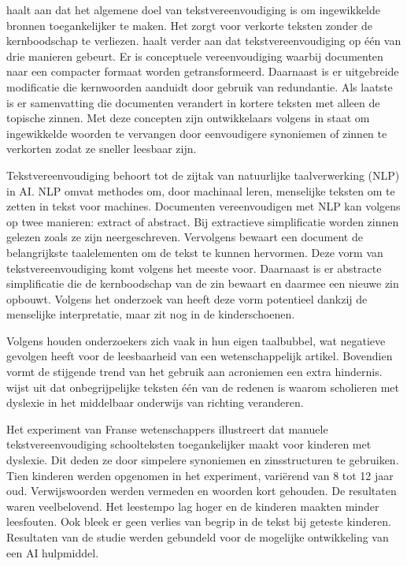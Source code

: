 \textcite{Shardlow2014} haalt aan dat het algemene doel van tekstvereenvoudiging is om ingewikkelde bronnen toegankelijker te maken. Het zorgt voor verkorte teksten zonder de kernboodschap te verliezen. \textcite{Siddharthan2014} haalt verder aan dat tekstvereenvoudiging op één van drie manieren gebeurt. Er is conceptuele vereenvoudiging waarbij documenten naar een compacter formaat worden getransformeerd. Daarnaast is er uitgebreide modificatie die kernwoorden aanduidt door gebruik van redundantie. Als laatste is er samenvatting die documenten verandert in kortere teksten met alleen de topische zinnen. Met deze concepten zijn ontwikkelaars volgens \textcite{Siddharthan2014} in staat om ingewikkelde woorden te vervangen door eenvoudigere synoniemen of zinnen te verkorten zodat ze sneller leesbaar zijn.

Tekstvereenvoudiging behoort tot de zijtak van natuurlijke taalverwerking (NLP) in AI. NLP omvat methodes om, door machinaal leren, menselijke teksten om te zetten in tekst voor machines. Documenten vereenvoudigen met NLP kan volgens \textcite{Chowdhary2020} op twee manieren: extract of abstract. Bij extractieve simplificatie worden zinnen gelezen zoals ze zijn neergeschreven. Vervolgens bewaart een document de belangrijkste taalelementen om de tekst te kunnen hervormen. Deze vorm van tekstvereenvoudiging komt volgens \autocite{Sciforce2020} het meeste voor. Daarnaast is er abstracte simplificatie die de kernboodschap van de zin bewaart en daarmee een nieuwe zin opbouwt. Volgens het onderzoek van \textcite{Chowdhary2020} heeft deze vorm potentieel dankzij de menselijke interpretatie, maar zit nog in de kinderschoenen.

Volgens \textcite{PlavenSigray2017} houden onderzoekers zich vaak in hun eigen taalbubbel, wat negatieve gevolgen heeft voor de leesbaarheid van een wetenschappelijk artikel. Bovendien vormt de stijgende trend van het gebruik aan acroniemen \textcite{Barnett2020} een extra hindernis. \textcite{Donato2022} wijst uit dat onbegrijpelijke teksten één van de redenen is waarom scholieren met dyslexie in het middelbaar onderwijs van richting veranderen.

Het experiment van Franse wetenschappers \newline \textcite{Gala2016} illustreert dat manuele tekstvereenvoudiging schoolteksten toegankelijker \newline maakt voor kinderen met dyslexie. Dit deden ze door simpelere synoniemen en zinsstructuren te gebruiken. Tien kinderen werden opgenomen in het experiment, variërend van 8 tot 12 jaar oud. Verwijswoorden werden vermeden en woorden kort gehouden. De resultaten waren veelbelovend. Het leestempo lag hoger en de kinderen maakten minder leesfouten. Ook bleek er geen verlies van begrip in de tekst bij geteste kinderen. Resultaten van de studie werden gebundeld voor de mogelijke ontwikkeling van een AI hulpmiddel.

